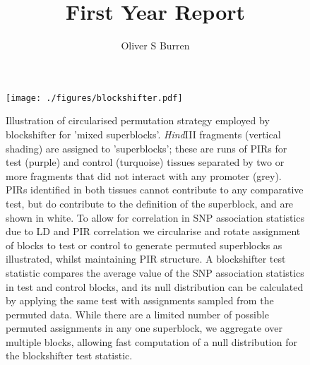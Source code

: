 \documentclass[a4paper,11pt]{article}
\author{Oliver S Burren}
\title{First Year Report}
\begin{document}
\begin{figure}[h]
\texttt{[image: ./figures/blockshifter.pdf]}
\caption{Illustration  of  circularised  permutation  strategy  employed  by blockshifter for  'mixed superblocks'. \textit{Hind}III fragments (vertical  shading) are assigned to 'superblocks';  these are runs of PIRs for test (purple) and control  (turquoise) tissues  separated  by  two or more  fragments that did not interact with any promoter (grey).  PIRs identified in both tissues cannot contribute to any comparative test, but do contribute to the definition of the superblock, and are shown in white.  To allow for correlation in SNP association statistics due to LD and PIR correlation we circularise and rotate assignment of blocks to test or control to generate permuted superblocks as illustrated, whilst maintaining PIR structure.  A blockshifter test statistic compares the average value of the SNP association statistics in test and control blocks, and its null distribution can be calculated by applying the same test with assignments sampled from the permuted data.  While there are a limited number of possible permuted assignments in any one superblock, we aggregate over multiple blocks, allowing fast computation of a null distribution for the blockshifter test statistic.}
\end{figure}
\end{document}
